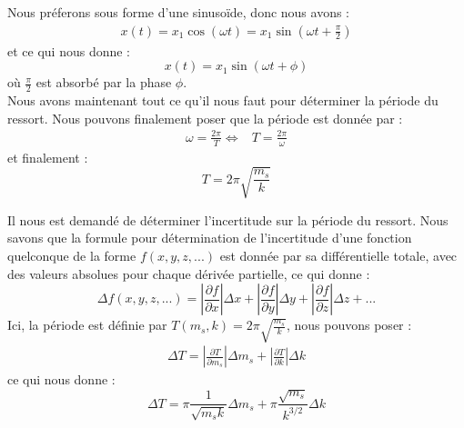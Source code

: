             Nous préferons sous forme d'une sinusoïde, donc nous avons :
            \begin{align*}
                x(t) = x_1 \cos(\omega t) = x_1 \sin(\omega t + \frac{\pi}{2})
            \end{align*}
            et ce qui nous donne :
            \begin{equation}
                x(t) = x_1 \sin(\omega t + \phi)
            \end{equation}
            où $\frac{\pi}{2}$ est absorbé par la phase $\phi$. \\
            Nous avons maintenant tout ce qu'il nous faut pour déterminer la période du ressort.
            Nous pouvons finalement poser que la période est donnée par :
            \begin{align*}
                \omega = \frac{2\pi}{T}
                \Leftrightarrow & T = \frac{2\pi}{\omega}
            \end{align*}
            et finalement :
            \begin{equation}
                T = 2\pi \sqrt{\frac{m_s}{k}}
            \end{equation}
            
            \newpage

            Il nous est demandé de déterminer l'incertitude sur la période du ressort.
            Nous savons que la formule pour détermination de l'incertitude d'une fonction quelconque de
            la forme $f(x, y, z, ...)$ est donnée par sa différentielle totale, avec des valeurs absolues pour
            chaque dérivée partielle, ce qui donne :
            \begin{equation}
                \Delta f(x, y, z, ...) = \left| \frac{\partial f}{\partial x} \right| \Delta x + \left| \frac{\partial f}{\partial y} \right| \Delta y + \left| \frac{\partial f}{\partial z} \right| \Delta z + ...
            \end{equation}
            Ici, la période est définie par $T(m_s, k) = 2\pi \sqrt{\frac{m_s}{k}}$, nous pouvons poser :
            \begin{align*}
                \Delta T = \left| \frac{\partial T}{\partial m_s} \right| \Delta m_s + \left| \frac{\partial T}{\partial k} \right| \Delta k
            \end{align*}
            ce qui nous donne :
            \begin{equation}
                \Delta T = \pi \frac{1}{\sqrt{m_s k}} \Delta m_s + \pi \frac{\sqrt{m_s}}{k^{3/2}} \Delta k
            \end{equation}

